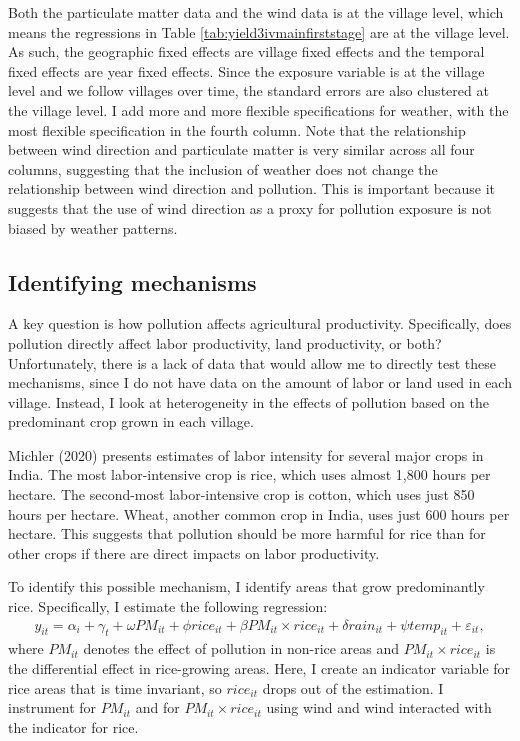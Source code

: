 \documentclass[
]{article}
\begin{document}
Both the particulate matter data and the wind data is at the village level, which means the regressions in Table \ref{tab:yield3ivmainfirststage} are at the village level. As such, the geographic fixed effects are village fixed effects and the temporal fixed effects are year fixed effects. Since the exposure variable is at the village level and we follow villages over time, the standard errors are also clustered at the village level. I add more and more flexible specifications for weather, with the most flexible specification in the fourth column. Note that the relationship between wind direction and particulate matter is very similar across all four columns, suggesting that the inclusion of weather does not change the relationship between wind direction and pollution. This is important because it suggests that the use of wind direction as a proxy for pollution exposure is not biased by weather patterns.

\hypertarget{identifying-mechanisms}{%
\subsection{Identifying mechanisms}\label{identifying-mechanisms}}

A key question is how pollution affects agricultural productivity. Specifically, does pollution directly affect labor productivity, land productivity, or both? Unfortunately, there is a lack of data that would allow me to directly test these mechanisms, since I do not have data on the amount of labor or land used in each village. Instead, I look at heterogeneity in the effects of pollution based on the predominant crop grown in each village.

Michler (2020) presents estimates of labor intensity for several major crops in India. The most labor-intensive crop is rice, which uses almost 1,800 hours per hectare. The second-most labor-intensive crop is cotton, which uses just 850 hours per hectare. Wheat, another common crop in India, uses just 600 hours per hectare. This suggests that pollution should be more harmful for rice than for other crops if there are direct impacts on labor productivity.

To identify this possible mechanism, I identify areas that grow predominantly rice. Specifically, I estimate the following regression:
\begin{gather} 
y_{it} = \alpha_{i} + \gamma_{t} + \omega PM_{it} + \phi rice_{it} + \beta PM_{it}\times rice_{it} + \delta rain_{it} + \psi temp_{it} + \varepsilon_{it},
\end{gather}
where \(PM_{it}\) denotes the effect of pollution in non-rice areas and \(PM_{it}\times rice_{it}\) is the differential effect in rice-growing areas. Here, I create an indicator variable for rice areas that is time invariant, so \(rice_{it}\) drops out of the estimation. I instrument for \(PM_{it}\) and for \(PM_{it}\times rice_{it}\) using wind and wind interacted with the indicator for rice.
\end{document}
